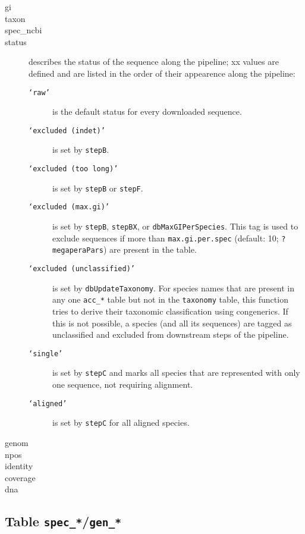 \documentclass[12pt]{article}
\begin{document}
\begin{description}
\item[gi] 
\item[taxon] 
\item[spec\_ncbi] 
\item[status] describes the status of the sequence along the pipeline; xx values are defined and are listed in the order of their appearence along the pipeline:
	\begin{description}
	\item[\texttt{`raw'}] is the default status for every downloaded sequence.
	\item[\texttt{`excluded (indet)'}] is set by \texttt{stepB}.
	\item[\texttt{`excluded (too long)'}] is set by \texttt{stepB} or \texttt{stepF}.
	\item[\texttt{`excluded (max.gi)'}] is set by \texttt{stepB}, \texttt{stepBX},  or \texttt{dbMaxGIPerSpecies}. This tag is used to exclude sequences if more than \texttt{max.gi.per.spec} (default: 10; \texttt{?megaperaPars}) are present in the table.
	\item[\texttt{`excluded (unclassified)'}]  is set by \texttt{dbUpdateTaxonomy}. For species names that are present in any one \texttt{acc\_*} table but not in the \texttt{taxonomy} table, this function tries to derive their taxonomic classification using congenerics. If this is not possible, a species (and all its sequences) are tagged as unclassified and excluded from downstream steps of the pipeline.
	\item[\texttt{`single'}] is set by \texttt{stepC} and marks all species that are represented with only one sequence, not requiring alignment.
	\item[\texttt{`aligned'}] is set by \texttt{stepC} for all aligned species.
	\end{description}

\item[genom] 
\item[npos] 
\item[identity] 
\item[coverage] 
\item[dna]
\end{description}


\subsection{Table \texttt{spec\_*}/\texttt{gen\_*}}
\end{document}
